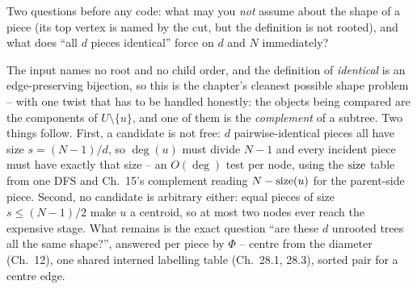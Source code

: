 \begin{attemptgate}
Two questions before any code: what may you \emph{not} assume about the shape of a piece
(its top vertex is named by the cut, but the definition is not rooted), and what does
``all \(d\) pieces identical'' force on \(d\) and \(N\) immediately?
\end{attemptgate}

The input names no root and no child order, and the definition of \emph{identical} is an
edge-preserving bijection, so this is the chapter's cleanest possible shape problem -- with
one twist that has to be handled honestly: the objects being compared are the components of
\(U\setminus\{u\}\), and one of them is the \emph{complement} of a subtree. Two things
follow. First, a candidate is not free: \(d\) pairwise-identical pieces all have size
\(s=(N-1)/d\), so \(\deg(u)\) must divide \(N-1\) and every incident piece must have exactly
that size -- an \(O(\deg)\) test per node, using the \(\operatorname{size}\) table from one DFS and
Ch.~15's complement reading \(N-\operatorname{size}(u)\) for the parent-side piece. Second, no candidate
is arbitrary either: equal pieces of size \(s\le(N-1)/2\) make \(u\) a centroid, so at most
two nodes ever reach the expensive stage. What remains is the exact question ``are these
\(d\) unrooted trees all the same shape?'', answered per piece by \(\Phi\) -- centre from
the diameter (Ch.~12), one shared interned labelling table (Ch.~28.1, 28.3), sorted pair for
a centre edge.

